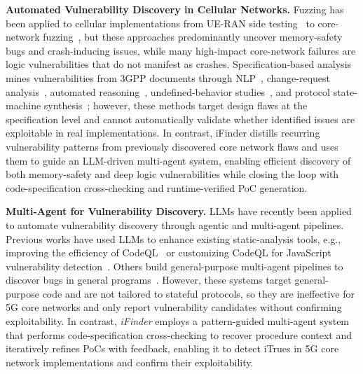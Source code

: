 \vspace{2pt}\noindent\textbf{Automated Vulnerability Discovery in Cellular Networks.}
Fuzzing has been applied to cellular implementations from UE-RAN side testing~\cite{kim2019touching, park2022doltest, garbelini2022towards} to core-network fuzzing~\cite{bennett2024ransacked,dong2025corecrisis, sun20255gc, yang2024feedback}, but these approaches predominantly uncover memory-safety bugs and crash-inducing issues, while many high-impact core-network failures are logic vulnerabilities that do not manifest as crashes.
Specification-based analysis mines vulnerabilities from 3GPP documents through NLP~\cite{chen2021bookworm}, change-request analysis~\cite{chen2022seeing}, automated reasoning~\cite{chen2023sherlock}, undefined-behavior studies~\cite{klischies2023instructions}, and protocol state-machine synthesis~\cite{alishtiaq2024hermes, rahman2024cellularlint, xie2025cellsecinspector}; 
however, these methods target design flaws at the specification level and cannot automatically validate whether identified issues are exploitable in real implementations.
In contrast, iFinder distills recurring vulnerability patterns from previously discovered core network flaws and uses them to guide an LLM-driven multi-agent system, enabling efficient discovery of both memory-safety and deep logic vulnerabilities while closing the loop with code-specification cross-checking and runtime-verified PoC generation.

\vspace{2pt}\noindent\textbf{Multi-Agent for Vulnerability Discovery.}
LLMs have recently been applied to automate vulnerability discovery through agentic and multi-agent pipelines. 
Previous works have used LLMs to enhance existing static-analysis tools, e.g., improving the efficiency of CodeQL~\cite{wang2026cqllm} or customizing CodeQL for JavaScript vulnerability detection~\cite{ghebremichael2026multi}.
Others build general-purpose multi-agent pipelines to discover bugs in general programs~\cite{wu2026mulvul, liu2026synthesizing}.
However, these systems target general-purpose code and are not tailored to stateful protocols, so they are ineffective for 5G core networks and only report vulnerability candidates without confirming exploitability.
In contrast, \textit{iFinder} employs a pattern-guided multi-agent system that performs code-specification cross-checking to recover procedure context and iteratively refines PoCs with feedback, enabling it to detect iTrues in 5G core network implementations and confirm their exploitability.


